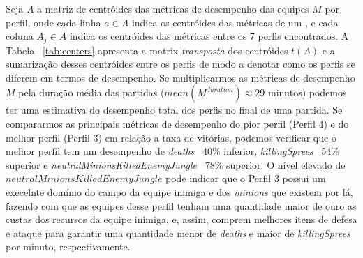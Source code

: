 Seja $A$ a matriz de centróides das métricas de desempenho das equipes $M$ por perfil, onde cada linha $a \in A$ indica os centróides das métricas de um , e cada coluna $A_j \in A$ indica os centróides das métricas entre os 7 perfis encontrados. A Tabela ~\ref{tab:centers} apresenta a matrix \textit{transposta} dos centróides $t(A)$ e a sumarização desses centróides entre os perfis de modo a  denotar como os perfis se diferem em termos de desempenho. Se multiplicarmos as métricas de desempenho $M$ pela duração média das partidas ($mean(M^{duration}) \approx 29$ minutos) podemos ter uma estimativa do desempenho total dos perfis no final de uma partida. Se compararmos as principais métricas de desempenho do pior perfil (Perfil 4) e do melhor perfil (Perfil 3) em relação a taxa de vitórias, podemos verificar que o melhor perfil tem um desempenho de \textit{deaths} ~40\% inferior, \textit{killingSprees} ~54\% superior e \textit{neutralMinionsKilledEnemyJungle} ~78\% superior. O nível elevado de $neutralMinionsKilledEnemyJungle$ pode indicar que o Perfil 3 possui um execelnte domínio do campo da equipe inimiga e dos \textit{minions} que existem por lá, fazendo com que as equipes desse perfil tenham uma quantidade maior de ouro as custas dos recursos da equipe inimiga, e, assim, comprem melhores itens de defesa e ataque para garantir uma quantidade menor de \textit{deaths} e maior de \textit{killingSprees} por minuto, respectivamente.


